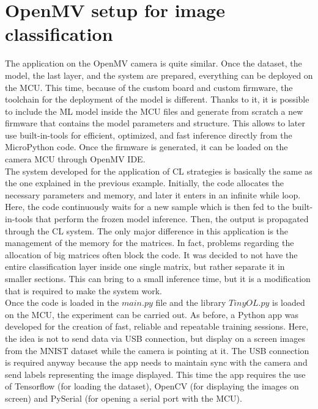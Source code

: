 \documentclass[12pt]{report}
\begin{document}
\section{OpenMV setup for image classification}
The application on the OpenMV camera is quite similar. Once the dataset, the model, the last layer, and the system are prepared, everything can be deployed on the MCU. This time, because of the custom board and custom firmware, the toolchain for the deployment of the model is different. Thanks to it, it is possible to include the ML model inside the MCU files and generate from scratch a new firmware that contains the model parameters and structure. This allows to later use built-in-tools for efficient, optimized, and fast inference directly from the MicroPython code. Once the firmware is generated, it can be loaded on the camera MCU through OpenMV IDE.\\
The system developed for the application of CL strategies is basically the same as the one explained in the previous example. Initially, the code allocates the necessary parameters and memory, and later it enters in an infinite while loop. Here, the code continuously waits for a new sample which is then fed to the built-in-tools that perform the frozen model inference. Then, the output is propagated through the CL system. The only major difference in this application is the management of the memory for the matrices. In fact, problems regarding the allocation of big matrices often block the code. It was decided to not have the entire classification layer inside one single matrix, but rather separate it in smaller sections. This can bring to a small inference time, but it is a modification that is required to make the system work. \\
Once the code is loaded in the $main.py$ file and the library $TinyOL.py$ is loaded on the MCU, the experiment can be carried out. As before, a Python app was developed for the creation of fast, reliable and repeatable training sessions. Here, the idea is not to send data via USB connection, but display on a screen images from the MNIST dataset while the camera is pointing at it. The USB connection is required anyway because the app needs to maintain sync with the camera and send labels representing the image displayed. This time the app requires the use of Tensorflow (for loading the dataset), OpenCV (for displaying the images on screen) and PySerial (for opening a serial port with the MCU). \\
\end{document}
